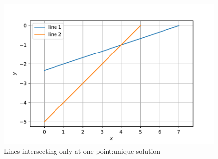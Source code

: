 \documentclass[journal,12pt,twocolumn]{IEEEtran}
\begin{document}
\begin{enumerate}
\begin{figure}[ht]
    \includegraphics[width= \columnwidth]{assignment2d.pdf}
    \caption{Lines intersecting only at one point:unique solution}
    \label{fig:2}
\end{figure}
\end{enumerate}
\end{document}
